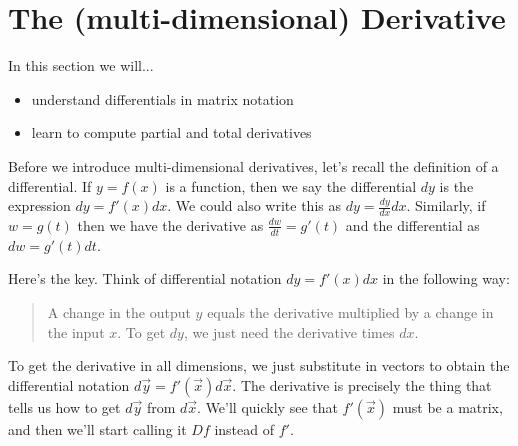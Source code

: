 %


\section{The (multi-dimensional) Derivative}
In this section we will...
\begin{itemize}
	\item understand differentials in matrix notation
	\item learn to compute partial and total derivatives
\end{itemize}
Before we introduce multi-dimensional derivatives, let's recall the definition of a differential.  If $y=f(x)$ is a function, then we say the differential $dy$ is the expression $dy=f'(x) dx$.  We could also write this as $dy = \frac{dy}{dx}dx$. Similarly, if $w=g(t)$ then we have the derivative as $\frac{dw}{dt}=g'(t)$ and the differential as $dw=g'(t)dt$. 


\begin{observation}
Here's the key.   Think of differential notation $dy=f'(x)dx$ in the following way: 
\begin{quote}
A change in the output $y$ equals the derivative multiplied by  a change in the input $x$. To get $dy$, we just need the derivative times $dx$. 
\end{quote}
To get the derivative in all dimensions, we just substitute in vectors to obtain the differential notation $d\vec y = f'(\vec x) d\vec x$. The derivative is precisely the thing that tells us how to get $d\vec y$ from $d\vec x$.  We'll quickly see that $f'(\vec x)$ must be a matrix, and then we'll start calling it $Df$ instead of $f'$. 
\end{observation}


